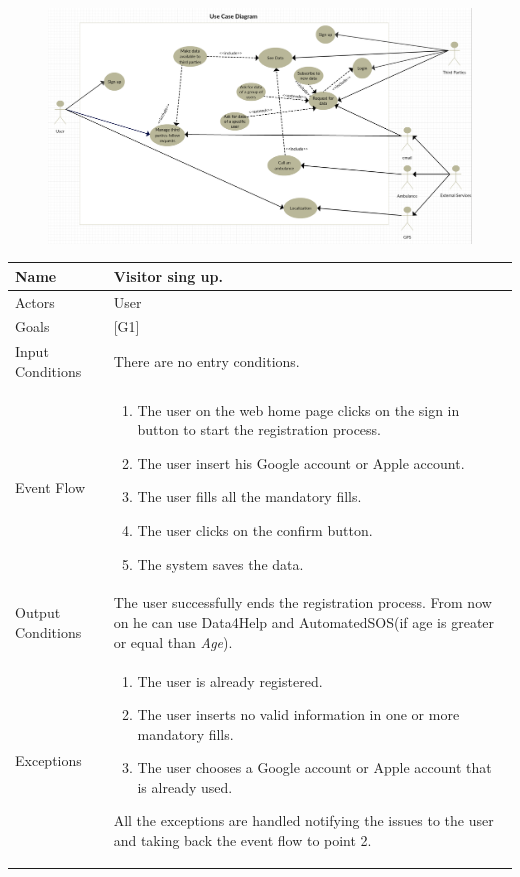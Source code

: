 \documentclass{article}
\begin{document}
\begin{figure}[h!]
\centering
    \textbf{}\par\medskip
	\includegraphics[width= \linewidth]{usecase.png}
\end{figure}
\begin{center}
    \begin{tabular}{ | l | p{10cm} |}
    \hline
    Name & Visitor sing up.\\ \hline
    Actors & User\\ \hline
   	Goals & {[G1]}\\ \hline
    Input Conditions & There are no entry conditions.\\ \hline
    Event Flow & \begin{enumerate}
    	\item The user on the web home page clicks on the sign in button to start the registration process.
    	\item The user insert his Google account or Apple account.
    	\item The user fills all the mandatory fills.
		\item The user clicks on the confirm button.
		\item The system saves the data.
    \end{enumerate} \\ \hline
    Output Conditions & The user successfully ends the registration process. From now on he can use Data4Help and AutomatedSOS(if age is greater or equal than \emph{Age}). \\ \hline
    Exceptions & \begin{enumerate}
    	\item The user is already registered.
		\item The user inserts no valid information in one or more mandatory fills.
		\item The user chooses a Google account or Apple account that is already used.
	\end{enumerate}
All the exceptions are handled notifying the issues to the user and taking back the event flow to point 2.
    \\ \hline
    \end{tabular}
\end{center}
\end{document}
